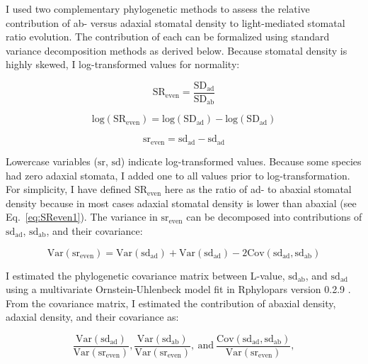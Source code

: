 \documentclass[12pt, oneside]{article}
\newcommand{\pkg}[1]{{\fontseries{b}\selectfont #1}}
\newcommand{\el}{L-value}
\begin{document}
I used two complementary phylogenetic methods to assess the relative contribution of ab- versus adaxial stomatal density to light-mediated stomatal ratio evolution. The contribution of each can be formalized using standard variance decomposition methods as derived below. Because stomatal density is highly skewed, I log-transformed values for normality:
 
\begin{equation} \label{eq:SReven2} 
  \mathrm{SR_{even}} = \frac{\mathrm{SD_{ad}}}{\mathrm{SD_{ab}}}
\end{equation}

\begin{equation} \label{eq:logSReven} 
  \mathrm{log(SR_{even})} = \mathrm{log(SD_{ad})} - \mathrm{log(SD_{ad})}
\end{equation}

\begin{equation} \label{eq:SReven3} 
  \mathrm{sr_{even}} = \mathrm{sd_{ad}} - \mathrm{sd_{ad}}
\end{equation}

Lowercase variables ($\mathrm{sr}$, $\mathrm{sd}$) indicate log-transformed values. Because some species had zero adaxial stomata, I added one to all values prior to log-transformation. For simplicity, I have defined $\mathrm{SR_{even}}$ here as the ratio of ad- to abaxial stomatal density because in most cases adaxial stomatal density is lower than abaxial (see Eq.~\ref{eq:SReven1}). The variance in $\mathrm{sr_{even}}$ can be decomposed into contributions of $\mathrm{sd_{ad}}$, $\mathrm{sd_{ab}}$, and their covariance:

\begin{equation} \label{eq:varDecomp}
	\mathrm{Var(sr_{even})} = \mathrm{Var(sd_{ad})} + \mathrm{Var(sd_{ad})} - 2 \mathrm{Cov(sd_{ad}, sd_{ab})}
\end{equation}

I estimated the phylogenetic covariance matrix between \el, $\mathrm{sd_{ab}}$, and $\mathrm{sd_{ad}}$ using a multivariate Ornstein-Uhlenbeck model fit in \pkg{Rphylopars} version 0.2.9 \citep{Goolsby_etal_2016, Goolsby_etal_2017}. From the covariance matrix, I estimated the contribution of abaxial density, adaxial density, and their covariance as:

\begin{equation} \label{eq:contribution}
	\frac{\mathrm{Var(sd_{ad})}}{\mathrm{Var(sr_{even})}}, \frac{\mathrm{Var(sd_{ab})}}{\mathrm{Var(sr_{even})}},~\textrm{and}~\frac{\mathrm{Cov(sd_{ad}, sd_{ab})}}{\mathrm{Var(sr_{even})}},
\end{equation}
\end{document}

